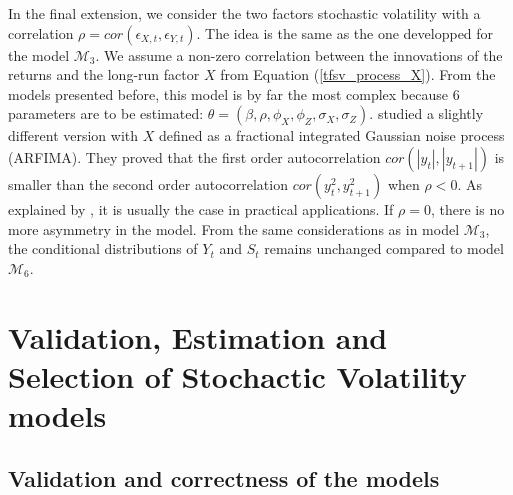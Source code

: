 \documentclass[11pt,a4,twosided,singlespacing,titlepagenumber=on]{scrreprt}
\numberwithin{equation}{chapter} %
\theoremstyle{remark}
\newcommand\numberthis{\addtocounter{equation}{1}\tag{\theequation}}
\begin{document}
In the final extension, we consider the two factors stochastic volatility with a correlation $\rho = cor(\epsilon_{X,t}, \epsilon_{Y,t})$. The idea is the same as the one developped for the model $\mathcal{M}_3$. We assume a non-zero correlation between the innovations of the returns and the long-run factor $X$ from Equation (\ref{tfsv_process_X}). From the models presented before, this model is by far the most complex because 6 parameters are to be estimated: $\theta = (\beta, \rho, \phi_X, \phi_Z, \sigma_X, \sigma_Z)$. \cite{ruiz2008} studied a slightly different version with $X$ defined as a fractional integrated Gaussian noise process (ARFIMA). They proved that the first order autocorrelation $cor(|y_t|,|y_{t+1}|)$ is smaller than the second order autocorrelation $cor(y_t^2,y_{t+1}^2)$ when $\rho < 0$. As explained by \cite{cont2005}, it is usually the case in practical applications. If $\rho = 0$, there is no more asymmetry in the model. From the same considerations as in model $\mathcal{M}_3$, the conditional distributions of $Y_t$ and $S_t$ remains unchanged compared to model $\mathcal{M}_6$.


\chapter{Validation, Estimation and Selection of Stochactic Volatility models}

\section{Validation and correctness of the models}
\end{document}
